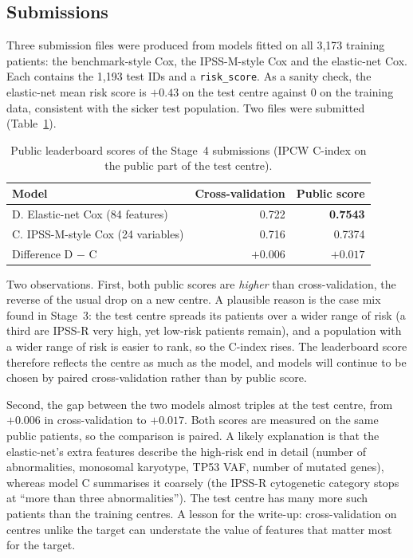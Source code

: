 \documentclass[11pt,a4paper]{article}
\begin{document}
\subsection{Submissions}
Three submission files were produced from models fitted on all 3{,}173 training patients:
the benchmark-style Cox, the IPSS-M-style Cox and the elastic-net Cox. Each contains the
1{,}193 test IDs and a \texttt{risk\_score}. As a sanity check, the elastic-net mean risk
score is $+0.43$ on the test centre against 0 on the training data, consistent with the
sicker test population. Two files were submitted (Table~\ref{tab:lb4}).

\begin{table}[H]
\centering
\caption{Public leaderboard scores of the Stage~4 submissions (IPCW C-index on the public
part of the test centre).}
\label{tab:lb4}
\begin{tabular}{lrr}
\toprule
Model & Cross-validation & Public score \\
\midrule
D. Elastic-net Cox (84 features)   & 0.722 & \textbf{0.7543} \\
C. IPSS-M-style Cox (24 variables) & 0.716 & 0.7374 \\
\midrule
Difference D $-$ C                 & $+0.006$ & $+0.017$ \\
\bottomrule
\end{tabular}
\end{table}

Two observations. First, both public scores are \emph{higher} than cross-validation, the
reverse of the usual drop on a new centre. A plausible reason is the case mix found in
Stage~3: the test centre spreads its patients over a wider range of risk (a third are
IPSS-R very high, yet low-risk patients remain), and a population with a wider range of
risk is easier to rank, so the C-index rises. The leaderboard score therefore reflects the
centre as much as the model, and models will continue to be chosen by paired
cross-validation rather than by public score.

Second, the gap between the two models almost triples at the test centre, from $+0.006$ in
cross-validation to $+0.017$. Both scores are measured on the same public patients, so the
comparison is paired. A likely explanation is that the elastic-net's extra features
describe the high-risk end in detail (number of abnormalities, monosomal karyotype, TP53
VAF, number of mutated genes), whereas model C summarises it coarsely (the IPSS-R
cytogenetic category stops at ``more than three abnormalities''). The test centre has
many more such patients than the training centres. A lesson for the write-up:
cross-validation on centres unlike the target can understate the value of features that
matter most for the target.
\end{document}
